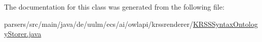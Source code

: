 The documentation for this class was generated from the following file\-:\begin{DoxyCompactItemize}
\item 
parsers/src/main/java/de/uulm/ecs/ai/owlapi/krssrenderer/\hyperlink{_k_r_s_s_syntax_ontology_storer_8java}{K\-R\-S\-S\-Syntax\-Ontology\-Storer.\-java}\end{DoxyCompactItemize}
